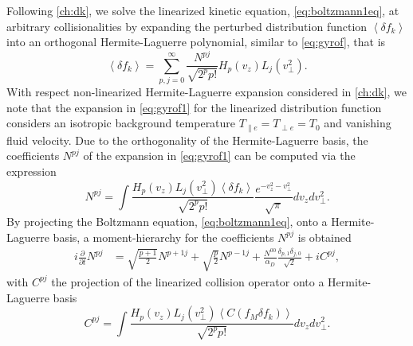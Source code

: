 Following \cref{ch:dk}, we solve the linearized kinetic equation, \cref{eq:boltzmann1eq}, at arbitrary collisionalities by expanding the perturbed distribution function $\left<\delta f_k\right>$ into an orthogonal Hermite-Laguerre polynomial, similar to \cref{eq:gyrof}, that is
%
\begin{equation}
    \left<\delta f_k\right> = \sum_{p,j=0}^{\infty}\frac{N^{pj}}{\sqrt{2^p p!}}H_p\left(v_z\right)L_j\left(v_\perp^2\right).
\label{eq:gyrof1}
\end{equation}
%
With respect non-linearized Hermite-Laguerre expansion considered in \cref{ch:dk}, we note that the expansion in \cref{eq:gyrof1} for the linearized distribution function considers an isotropic background temperature $T_{\parallel e}=T_{\perp e}=T_{0}$ and vanishing fluid velocity.
%
Due to the orthogonality of the Hermite-Laguerre basis, the coefficients $N^{pj}$ of the expansion in \cref{eq:gyrof1} can be computed via the expression
%
\begin{equation}
    N^{pj}=\int \frac{H_p(v_z) L_j(v_\perp^2) \left<\delta f_k\right> }{\sqrt{2^p p!}} \frac{e^{-v_z^2-v_\perp^2}}{\sqrt{\pi}} dv_z dv_\perp^2.
    \label{eq:gyromoments1}
\end{equation}
%
By projecting the Boltzmann equation, \cref{eq:boltzmann1eq}, onto a Hermite-Laguerre basis, a moment-hierarchy for the coefficients $N^{pj}$ is obtained
%
\begin{align}
    i \frac{\partial}{\partial t} N^{pj} &= \sqrt{\frac{p+1}{2}}N^{p+1 j}+\sqrt{\frac{p}{2}}N^{p-1 j}+ \frac{N^{00}}{\alpha_D}\frac{\delta_{p,1}\delta_{j,0}}{\sqrt{2}}+i C^{pj},
\label{eq:momenthierarchy}
\end{align}
%
with $C^{pj}$ the projection of the linearized collision operator onto a Hermite-Laguerre basis
%
\begin{equation}
    C^{pj}=\int \frac{H_p(v_z) L_j(v_\perp^2) \left<C(f_M \delta f_k)\right> }{\sqrt{2^p p!}} dv_z dv_\perp^2.
\label{eq:projectioncoll}
\end{equation}


